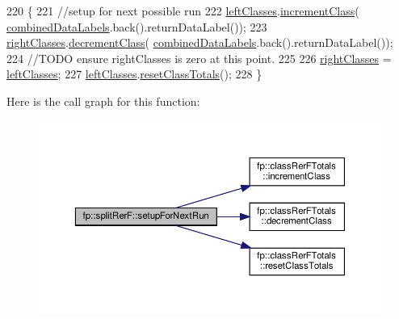 \begin{DoxyCode}
220                                              \{
221                     \textcolor{comment}{//setup for next possible run}
222                     \hyperlink{classfp_1_1splitRerF_aa5aa4856a4bc8e5f0852d8e6fa935cfc}{leftClasses}.\hyperlink{classfp_1_1classRerFTotals_a1be2afa6bf6490104eac4c283abe62ef}{incrementClass}(
      \hyperlink{classfp_1_1splitRerF_a2ce4d0a7ae4ba4958ddcc1adba71b2c9}{combinedDataLabels}.back().returnDataLabel());
223                     \hyperlink{classfp_1_1splitRerF_a8f78d6a0269d046328bead1cbf51be36}{rightClasses}.\hyperlink{classfp_1_1classRerFTotals_aac0c0d5bc058592a51d1fceeaf38a8fd}{decrementClass}(
      \hyperlink{classfp_1_1splitRerF_a2ce4d0a7ae4ba4958ddcc1adba71b2c9}{combinedDataLabels}.back().returnDataLabel());
224                     \textcolor{comment}{//TODO ensure rightClasses is zero at this point.}
225 
226                     \hyperlink{classfp_1_1splitRerF_a8f78d6a0269d046328bead1cbf51be36}{rightClasses} = \hyperlink{classfp_1_1splitRerF_aa5aa4856a4bc8e5f0852d8e6fa935cfc}{leftClasses};
227                     \hyperlink{classfp_1_1splitRerF_aa5aa4856a4bc8e5f0852d8e6fa935cfc}{leftClasses}.\hyperlink{classfp_1_1classRerFTotals_a60fa9a8dab5fdbfe5c2cb8e6b1f24579}{resetClassTotals}();
228                 \}
\end{DoxyCode}
Here is the call graph for this function\+:
\nopagebreak
\begin{figure}[H]
\begin{center}
\leavevmode
\includegraphics[width=350pt]{classfp_1_1splitRerF_ac7ee17995ee82e98a092089b5803fd70_cgraph}
\end{center}
\end{figure}
\mbox{\label{classfp_1_1splitRerF_a46321fe50cebbf12238e4e1be1928e0d}} 
